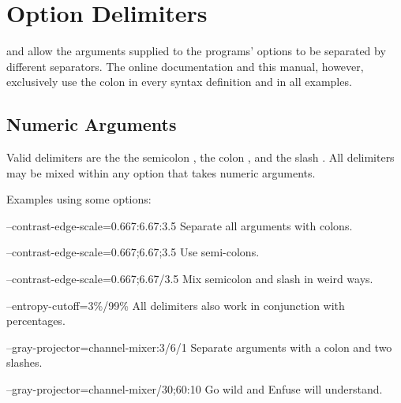 

\section[Option Delimiters\commonpart]{Option Delimiters\commonpart
  \label{sec:option-delimiters}
  }

 and  allow the arguments
supplied to the programs' options to be separated by different
separators.  The online documentation and this manual, however,
exclusively use the colon \sample{:} in every syntax definition and in
all examples.


\subsection[Numeric Arguments]{Numeric Arguments
  \label{sec:option-delimiters-numeric-arguments}
  }

Valid delimiters are the the semicolon \sample{;}, the colon
\sample{:}, and the slash \sample{/}.  All delimiters may be mixed
within any option that takes numeric arguments.

Examples using some  options:

\begin{codelist}
\item[--contrast-edge-scale=0.667:6.67:3.5]\itemend Separate all
  arguments with colons.

\item[--contrast-edge-scale=0.667;6.67;3.5]\itemend Use semi-colons.

\item[--contrast-edge-scale=0.667;6.67/3.5]\itemend Mix semicolon and
  slash in weird ways.

\item[--entropy-cutoff=3\%/99\%]\itemend All delimiters also work in
  conjunction with percentages.

\item[--gray-projector=channel-mixer:3/6/1]\itemend Separate arguments
  with a colon and two slashes.

\item[--gray-projector=channel-mixer/30;60:10]\itemend Go wild and
  Enfuse will understand.
\end{codelist}


